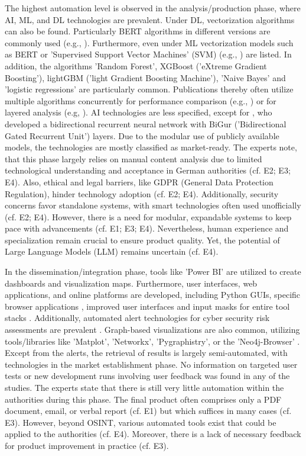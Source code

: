 \documentclass[10pt]{article}
\begin{document}
The highest automation level is observed in the analysis/production phase, where AI, ML, and DL technologies are prevalent.
Under DL, vectorization algorithms can also be found. Particularly BERT algorithms in different versions are commonly used
(e.g., \cite{Ma.2022}). Furthermore, even under ML vectorization models such as BERT or
'Supervised Support Vector Machines' (SVM) (e.g., \cite{Iorga.2020}) are listed.
In addition, the algorithms 'Random Forest', XGBoost ('eXtreme Gradient Boosting'),
lightGBM ('light Gradient Boosting Machine'), 'Naive Bayes' and 'logistic regressions' are particularly common.
Publications thereby often utilize multiple algorithms concurrently for performance comparison (e.g., \cite{Tao.2023})
or for layered analysis (e.g, \cite{Yang.2022}). AI technologies are less specified,
except for \cite{Dale.2023}, who developed a bidirectional recurrent neural network with
BiGur ('Bidirectional Gated Recurrent Unit') layers. Due to the modular use of publicly available models,
the technologies are mostly classified as market-ready. The experts note, that this phase largely relies
on manual content analysis due to limited technological understanding and acceptance in German authorities
(cf. E2; E3; E4). Also, ethical and legal barriers, like GDPR (General Data Protection Regulation), hinder technology
adoption (cf. E2; E4). Additionally, security concerns favor standalone systems,
with smart technologies often used unofficially (cf. E2; E4). However, there is a need for modular,
expandable systems to keep pace with advancements (cf. E1; E3; E4). Nevertheless, human experience
and specialization remain crucial to ensure product quality. Yet, the potential of Large Language Models (LLM) remains uncertain (cf. E4).

In the dissemination/integration phase, tools like 'Power BI' \cite{Tao.2023}
are utilized to create dashboards and visualization maps. Furthermore, user interfaces,
web applications, and online platforms are developed, including Python GUIs,
specific browser applications \cite{Elmas.2022},
improved user interfaces and input masks for entire tool stacks \cite{Arjun.2020}.
Additionally, automated alert technologies for cyber security risk assessments are prevalent \cite{Ahuja.2022}. Graph-based visualizations are also common, utilizing tools/libraries like 'Matplot', 'Networkx', 'Pygraphistry', or the 'Neo4j-Browser' \cite{Middleton.2020}.
Except from the alerts, the retrieval of results is largely semi-automated, with technologies in the market establishment phase. No information on targeted user tests or new development runs involving user feedback was found in any of the studies. The experts state that there is still very little
automation within the authorities during this phase. The final product often comprises only a PDF document, email, or verbal report (cf. E1) but which suffices in many cases (cf. E3).
However, beyond OSINT, various automated tools exist that could be applied to the authorities (cf. E4). Moreover, there is a lack of necessary feedback for product improvement in practice (cf. E3).
\end{document}
